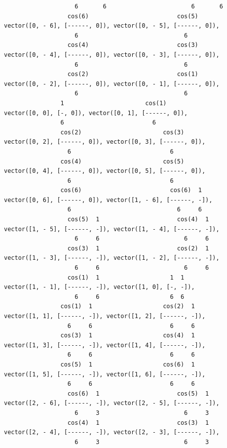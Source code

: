 \documentclass[12pt,letterpaper]{article}
\begin{document}
\begin{verbatim}
                    6       6                        6       6
                  cos(6)                         cos(5)
vector([0, - 6], [------, 0]), vector([0, - 5], [------, 0]), 
                    6                              6
                  cos(4)                         cos(3)
vector([0, - 4], [------, 0]), vector([0, - 3], [------, 0]), 
                    6                              6
                  cos(2)                         cos(1)
vector([0, - 2], [------, 0]), vector([0, - 1], [------, 0]), 
                    6                              6
                1                       cos(1)
vector([0, 0], [-, 0]), vector([0, 1], [------, 0]), 
                6                         6
                cos(2)                       cos(3)
vector([0, 2], [------, 0]), vector([0, 3], [------, 0]), 
                  6                            6
                cos(4)                       cos(5)
vector([0, 4], [------, 0]), vector([0, 5], [------, 0]), 
                  6                            6
                cos(6)                         cos(6)  1
vector([0, 6], [------, 0]), vector([1, - 6], [------, -]), 
                  6                              6     6
                  cos(5)  1                      cos(4)  1
vector([1, - 5], [------, -]), vector([1, - 4], [------, -]), 
                    6     6                        6     6
                  cos(3)  1                      cos(2)  1
vector([1, - 3], [------, -]), vector([1, - 2], [------, -]), 
                    6     6                        6     6
                  cos(1)  1                    1  1
vector([1, - 1], [------, -]), vector([1, 0], [-, -]), 
                    6     6                    6  6
                cos(1)  1                    cos(2)  1
vector([1, 1], [------, -]), vector([1, 2], [------, -]), 
                  6     6                      6     6
                cos(3)  1                    cos(4)  1
vector([1, 3], [------, -]), vector([1, 4], [------, -]), 
                  6     6                      6     6
                cos(5)  1                    cos(6)  1
vector([1, 5], [------, -]), vector([1, 6], [------, -]), 
                  6     6                      6     6
                  cos(6)  1                      cos(5)  1
vector([2, - 6], [------, -]), vector([2, - 5], [------, -]), 
                    6     3                        6     3
                  cos(4)  1                      cos(3)  1
vector([2, - 4], [------, -]), vector([2, - 3], [------, -]), 
                    6     3                        6     3

\end{verbatim}
\end{document}
